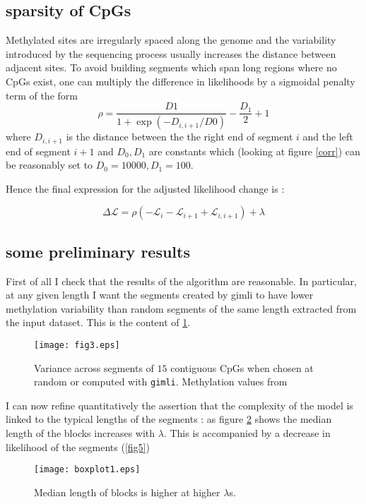 \documentclass[12pt]{amsart}
\newcommand{\lik}{\ensuremath{\mathcal{L}}}
\newcommand{\gimli}{\texttt{gimli}}
\begin{document}
\subsection{sparsity of CpGs}

Methylated sites are irregularly spaced along the genome and the variability 
introduced by the sequencing process usually increases the distance 
between adjacent sites.
To avoid building segments which span long regions where no CpGs exist, one 
can multiply the difference in likelihoods by a sigmoidal penalty term of the
form \[\rho=\frac{D1}{1+\exp(-D_{i,i+1}/D0)}-\frac{D_1}{2}+1\] where $D_{i,i+1}$ is the distance 
between the the right end of segment $i$ and the left end of segment $i+1$ and 
$D_0,D_1$ are constants which (looking at figure \ref{corr}) can be reasonably 
set to $D_0=10000,D_1=100$. 

Hence the final expression for the adjusted likelihood change is :

\begin{equation}
\Delta \lik = \rho ( -\mathcal{L}_i-\mathcal{L}_{i+1}+\mathcal{L}_{i,i+1} )  +\lambda
\end{equation}


\subsection{some preliminary results}

First of all I check that the results of the algorithm are reasonable.
In particular, at any given length I want the segments created by gimli to have lower methylation
variability than random segments of the same length extracted from the input dataset. This is the content of
\ref{fig3}.

\begin{figure}\label{fig3}
\texttt{[image: fig3.eps]}
\caption{Variance across segments of $15$ contiguous CpGs when chosen at random or 
computed with \gimli{}. Methylation values from }
\end{figure}

I can now refine quantitatively the assertion that the complexity of the model
is linked to the typical lengths of the segments : as figure \ref{fig4} 
shows the median length of the blocks increases with $\lambda$. This is 
accompanied by a decrease in likelihood of the segments (\ref{fig5})

\begin{figure}\label{fig4}
\texttt{[image: boxplot1.eps]}
\caption{Median length of blocks is higher at higher $\lambda$s.}
\end{figure}
\end{document}
